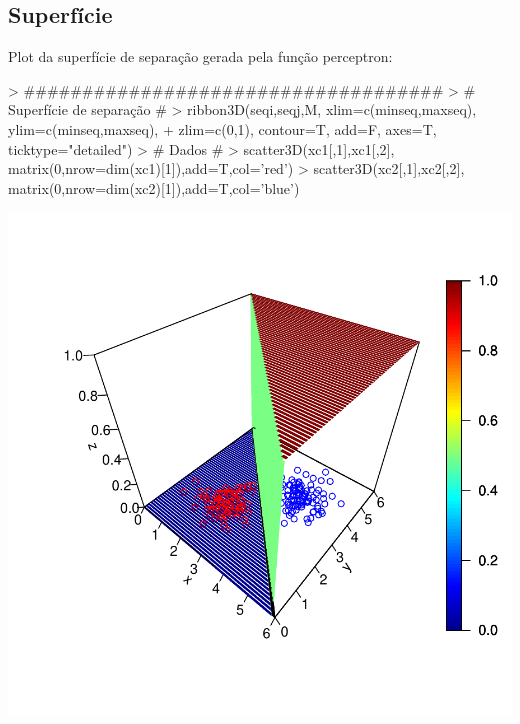 \documentclass{article}
\begin{document}
\subsection{Superfície}
Plot da superfície de separação gerada pela função perceptron:
\begin{Schunk}
\begin{Sinput}
> ####################################
> # Superfície de separação #
> ribbon3D(seqi,seqj,M, xlim=c(minseq,maxseq), ylim=c(minseq,maxseq), 
+          zlim=c(0,1), contour=T, add=F, axes=T, ticktype="detailed")
> # Dados #
> scatter3D(xc1[,1],xc1[,2], matrix(0,nrow=dim(xc1)[1]),add=T,col='red')
> scatter3D(xc2[,1],xc2[,2], matrix(0,nrow=dim(xc2)[1]),add=T,col='blue')
\end{Sinput}
\end{Schunk}
\includegraphics{perceptron-004}
\end{document}
